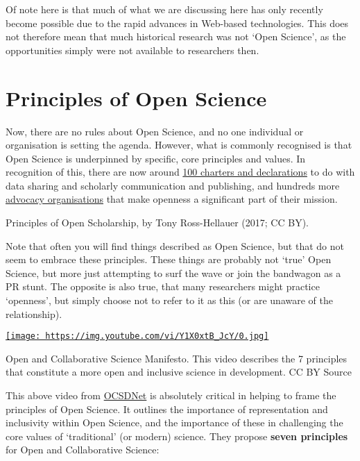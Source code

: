 \documentclass[]{book}
\begin{document}
Of note here is that much of what we are discussing here has only recently become possible due to the rapid advances in Web-based technologies. This does not therefore mean that much historical research was not `Open Science', as the opportunities simply were not available to researchers then.

\hypertarget{principles-of-open-science}{%
\section{Principles of Open Science }\label{principles-of-open-science}}

Now, there are no rules about Open Science, and no one individual or organisation is setting the agenda. However, what is commonly recognised is that Open Science is underpinned by specific, core principles and values. In recognition of this, there are now around \href{https://docs.google.com/spreadsheets/d/1-aRXFiRg-VL9hpLpxoJqX6-OC-A0R2oCogHfIx52Nug/edit\#gid=956616118}{100 charters and declarations} to do with data sharing and scholarly communication and publishing, and hundreds more \href{http://oad.simmons.edu/oadwiki/Advocacy_organizations_for_OA}{advocacy organisations} that make openness a significant part of their mission.

Principles of Open Scholarship, by Tony Ross-Hellauer (2017; CC BY).

Note that often you will find things described as Open Science, but that do not seem to embrace these principles. These things are probably not `true' Open Science, but more just attempting to surf the wave or join the bandwagon as a PR stunt. The opposite is also true, that many researchers might practice `openness', but simply choose not to refer to it as this (or are unaware of the relationship).

\href{https://www.youtube.com/watch?v=Y1X0xtB_JcY}{\texttt{[image: https://img.youtube.com/vi/Y1X0xtB\_JcY/0.jpg]}}

Open and Collaborative Science Manifesto. This video describes the 7 principles that constitute a more open and inclusive science in development. CC BY Source

This above video from \href{https://ocsdnet.org/manifesto/open-science-manifesto/}{OCSDNet} is absolutely critical in helping to frame the principles of Open Science. It outlines the importance of representation and inclusivity within Open Science, and the importance of these in challenging the core values of `traditional' (or modern) science. They propose \textbf{seven principles} for Open and Collaborative Science:
\end{document}
